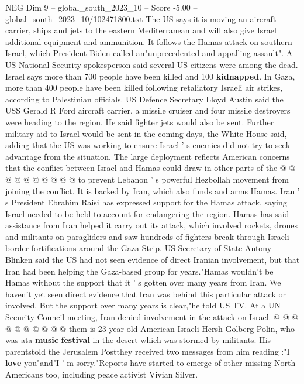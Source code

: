 \begin{textsample}{NEG Dim 9 – global\_south\_2023\_10 – Score -5.00 – global\_south\_2023\_10/102471800.txt}  \label{ex:f9_neg_368}
The US says it is moving an aircraft carrier, ships and jets to the eastern Mediterranean and will also give Israel additional equipment and ammunition.
It follows the Hamas attack on southern Israel, which President Biden called an"unprecedented and appalling assault".
A US National Security spokesperson said several US citizens were among the dead.
Israel says more than 700 people have been killed and 100 \textbf{kidnapped}.
In Gaza, more than 400 people have been killed following retaliatory Israeli air strikes, according to Palestinian officials.
US Defence Secretary Lloyd Austin said the USS Gerald R Ford aircraft carrier, a missile cruiser and four missile destroyers were heading to the region.
He said fighter jets would also be sent.
Further military aid to Israel would be sent in the coming days, the White House said, adding that the US was working to ensure Israel ' s enemies did not try to seek advantage from the situation.
The large deployment reflects American concerns that the conflict between Israel and Hamas could draw in other parts of the @ @ @ @ @ @ @ @ @ @ to prevent Lebanon ' s powerful Hezbollah movement from joining the conflict.
It is backed by Iran, which also funds and arms Hamas.
Iran ' s President Ebrahim Raisi has expressed support for the Hamas attack, saying Israel needed to be held to account for endangering the region.
Hamas has said assistance from Iran helped it carry out its attack, which involved rockets, drones and militants on paragliders and saw hundreds of fighters break through Israeli border fortifications around the Gaza Strip.
US Secretary of State Antony Blinken said the US had not seen evidence of direct Iranian involvement, but that Iran had been helping the Gaza-based group for years."Hamas wouldn't be Hamas without the support that it ' s gotten over many years from Iran.
We haven't yet seen direct evidence that Iran was behind this particular attack or involved.
But the support over many years is clear,"he told US TV.
At a UN Security Council meeting, Iran denied involvement in the attack on Israel. @ @ @ @ @ @ @ @ @ @ them is 23-year-old American-Israeli Hersh Golberg-Polin, who was ata \textbf{music} \textbf{festival} in the desert which was stormed by militants.
His parentstold the Jerusalem Postthey received two messages from him reading :"I \textbf{love} you"and"I ' m sorry."Reports have started to emerge of other missing North Americans too, including peace activist Vivian Silver.

\end{textsample}
